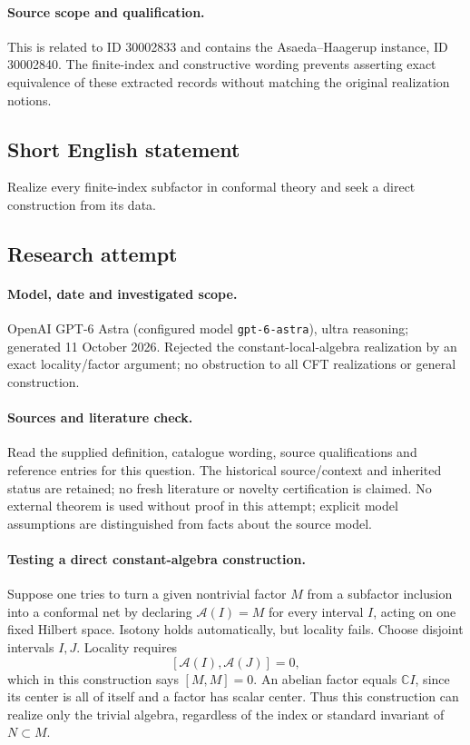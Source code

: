 \documentclass[11pt]{article}
\begin{document}
\paragraph{Source scope and qualification.}
This is related to ID 30002833 and contains the Asaeda--Haagerup instance, ID 30002840. The finite-index and constructive wording prevents asserting exact equivalence of these extracted records without matching the original realization notions.
\subsection{Short English statement}
Realize every finite-index subfactor in conformal theory and seek a direct construction from its data.
\subsection{Research attempt}
\paragraph{Model, date and investigated scope.}
OpenAI GPT-6 Astra (configured model \texttt{gpt-6-astra}), ultra reasoning; generated 11 October 2026. Rejected the constant-local-algebra realization by an exact locality/factor argument; no obstruction to all CFT realizations or general construction.

\paragraph{Sources and literature check.}
Read the supplied definition, catalogue wording, source qualifications and reference entries for this question. The historical source/context and inherited status are retained; no fresh literature or novelty certification is claimed. No external theorem is used without proof in this attempt; explicit model assumptions are distinguished from facts about the source model.

\paragraph{Testing a direct constant-algebra construction.} Suppose one tries to turn a given nontrivial factor \(M\) from a subfactor inclusion into a conformal net by declaring \(\mathcal A(I)=M\) for every interval \(I\), acting on one fixed Hilbert space. Isotony holds automatically, but locality fails. Choose disjoint intervals \(I,J\). Locality requires
\[
 [\mathcal A(I),\mathcal A(J)]=0,
\]
which in this construction says \([M,M]=0\). An abelian factor equals \(\mathbb C I\), since its center is all of itself and a factor has scalar center. Thus this construction can realize only the trivial algebra, regardless of the index or standard invariant of \(N\subset M\).
\end{document}
